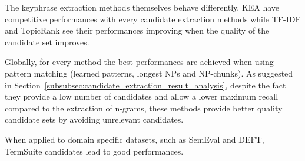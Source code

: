       The keyphrase extraction methods themselves behave differently. KEA have
      competitive performances with every candidate extraction methods while
      TF-IDF and TopicRank see their performances improving when the quality of
      the candidate set improves.

      Globally, for every method the best performances are achieved when using
      pattern matching (learned patterns, longest NPs and NP-chunks). As
      suggested in Section~\ref{subsubsec:candidate_extraction_result_analysis},
      despite the fact they provide a low number of candidates and allow a lower
      maximum recall compared to the extraction of n-grams, these methods
      provide better quality candidate sets by avoiding unrelevant candidates.

      When applied to domain specific datasets, such as SemEval and DEFT,
      TermSuite candidates  lead to good performances.

